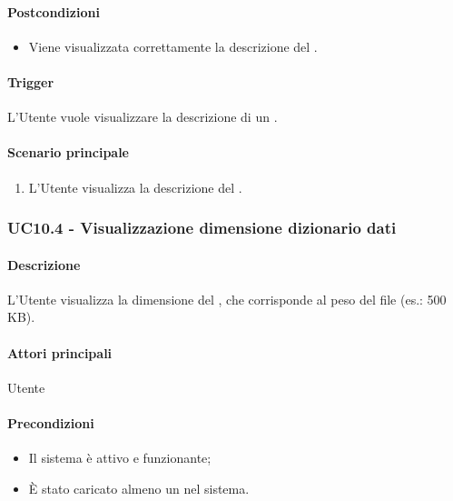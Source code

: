 \paragraph*{Postcondizioni}
\begin{itemize}
  \item Viene visualizzata correttamente la descrizione del .
\end{itemize}

\paragraph*{Trigger}
L'Utente vuole visualizzare la descrizione di un .

\paragraph*{Scenario principale}
\begin{enumerate}
  \item L'Utente visualizza la descrizione del .
\end{enumerate}


\subsubsection{UC10.4 - Visualizzazione dimensione dizionario dati}\label{UC10point4}
\paragraph*{Descrizione}
L'Utente visualizza la dimensione del , che corrisponde al peso del file (es.: 500 KB).

\paragraph*{Attori principali}
Utente

\paragraph*{Precondizioni}
\begin{itemize}
  \item Il sistema è attivo e funzionante;
  \item È stato caricato almeno un  nel sistema. 
\end{itemize}

